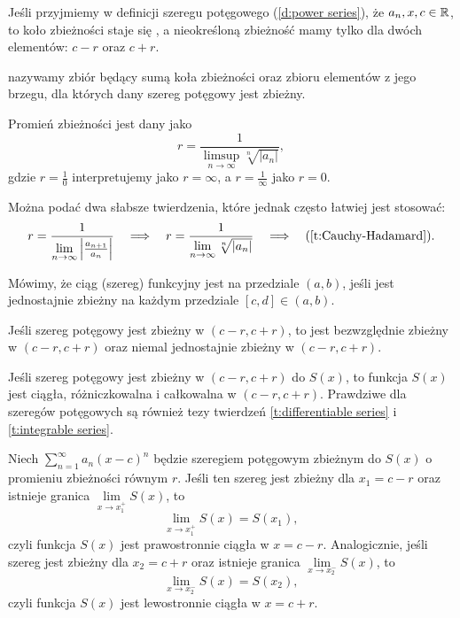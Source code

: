 \begin{remark*}
    Jeśli przyjmiemy w definicji szeregu potęgowego (\ref{d:power series}), że $a_n, x, c \in \mathbb R$, to koło zbieżności staje się , a nieokreśloną zbieżność mamy tylko dla dwóch elementów: $c - r$ oraz $c + r$.
\end{remark*}

 nazywamy zbiór będący sumą koła zbieżności oraz zbioru elementów z jego brzegu, dla których dany szereg potęgowy jest zbieżny.

\begin{theorem}
    \label{t:Cauchy-Hadamard}
    Promień zbieżności jest dany jako
    \[ r = \frac{1}{\limsup\limits_{n\to\infty}\sqrt[n]{|a_n|}}, \]
    gdzie $r = \frac{1}{0}$ interpretujemy jako $r = \infty$, a $r = \frac{1}{\infty}$ jako $r = 0$.
\end{theorem}

Można podać dwa słabsze twierdzenia, które jednak często łatwiej jest stosować:
\[ r = \frac{1}{\lim\limits_{n\to\infty} \left|\frac{a_{n+1}}{a_n}\right|} \hspace{1em}\Longrightarrow\hspace{1em} r = \frac{1}{\lim\limits_{n\to\infty}\sqrt[n]{|a_n|}} \hspace{1em}\Longrightarrow\hspace{1em} (\ref{t:Cauchy-Hadamard}). \]

Mówimy, że ciąg (szereg) funkcyjny jest  na przedziale $(a, b)$, jeśli jest jednostajnie zbieżny na każdym przedziale $[c, d] \in (a, b)$.

\begin{fact}
    Jeśli szereg potęgowy jest zbieżny w $(c-r, c+r)$, to jest bezwzględnie zbieżny w $(c-r, c+r)$ oraz niemal jednostajnie zbieżny w $(c-r, c+r)$.
\end{fact}

\begin{fact}
    Jeśli szereg potęgowy jest zbieżny w $(c-r, c+r)$ do $S(x)$, to funkcja $S(x)$ jest ciągła, różniczkowalna i całkowalna w $(c-r, c+r)$. Prawdziwe dla szeregów potęgowych są również tezy twierdzeń \ref{t:differentiable series} i \ref{t:integrable series}.
\end{fact}

\begin{theorem}[Abela]
    \label{t:Abel}
    Niech $\sum_{n=1}^\infty a_n(x - c)^n$ będzie szeregiem potęgowym zbieżnym do $S(x)$ o promieniu zbieżności równym $r$. Jeśli ten szereg jest zbieżny dla $x_1 = c - r$ oraz istnieje granica $\lim\limits_{x\to x_1^+}S(x)$, to
    \[ \lim_{x\to x_1^+}S(x) = S(x_1), \]
    czyli funkcja $S(x)$ jest prawostronnie ciągła w $x = c - r$. Analogicznie, jeśli szereg jest zbieżny dla $x_2 = c + r$ oraz istnieje granica $\lim\limits_{x\to x_2^-}S(x)$, to
    \[ \lim_{x\to x_2^-}S(x) = S(x_2), \]
    czyli funkcja $S(x)$ jest lewostronnie ciągła w $x = c + r$.
\end{theorem}

